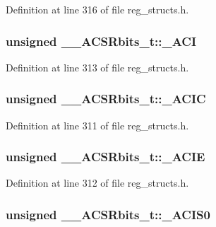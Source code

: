Definition at line 316 of file reg\+\_\+structs.\+h.

\hypertarget{union_____a_c_s_rbits__t_af31654da9a49ad8389976faf3d4e6cce}{
\subsubsection[{\+\_\+\+A\+C\+I}]{\setlength{\rightskip}{0pt plus 5cm}unsigned \+\_\+\+\_\+\+A\+C\+S\+Rbits\+\_\+t\+::\+\_\+\+A\+C\+I}}\label{union_____a_c_s_rbits__t_af31654da9a49ad8389976faf3d4e6cce}


Definition at line 313 of file reg\+\_\+structs.\+h.

\hypertarget{union_____a_c_s_rbits__t_a6fd9335a2f3d60b829b237a66b2bcb31}{
\subsubsection[{\+\_\+\+A\+C\+I\+C}]{\setlength{\rightskip}{0pt plus 5cm}unsigned \+\_\+\+\_\+\+A\+C\+S\+Rbits\+\_\+t\+::\+\_\+\+A\+C\+I\+C}}\label{union_____a_c_s_rbits__t_a6fd9335a2f3d60b829b237a66b2bcb31}


Definition at line 311 of file reg\+\_\+structs.\+h.

\hypertarget{union_____a_c_s_rbits__t_a0bb335f3c419679a3a5ab48413409780}{
\subsubsection[{\+\_\+\+A\+C\+I\+E}]{\setlength{\rightskip}{0pt plus 5cm}unsigned \+\_\+\+\_\+\+A\+C\+S\+Rbits\+\_\+t\+::\+\_\+\+A\+C\+I\+E}}\label{union_____a_c_s_rbits__t_a0bb335f3c419679a3a5ab48413409780}


Definition at line 312 of file reg\+\_\+structs.\+h.

\hypertarget{union_____a_c_s_rbits__t_ab8072dd91091e88a6d445d9b97d56f74}{
\subsubsection[{\+\_\+\+A\+C\+I\+S0}]{\setlength{\rightskip}{0pt plus 5cm}unsigned \+\_\+\+\_\+\+A\+C\+S\+Rbits\+\_\+t\+::\+\_\+\+A\+C\+I\+S0}}\label{union_____a_c_s_rbits__t_ab8072dd91091e88a6d445d9b97d56f74}


